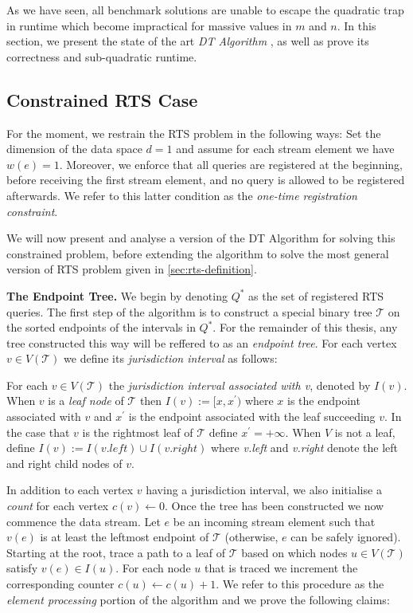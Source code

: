 As we have seen, all benchmark solutions are unable to escape the quadratic trap in runtime which become impractical for massive values in $m$ and $n$. In this section, we present the state of the art \textit{DT Algorithm} \cite{GAN16}, as well as prove its correctness and sub-quadratic runtime.

\subsection{Constrained RTS Case}
\label{ssec:constrained-DT-algorithm}

For the moment, we restrain the RTS problem in the following ways: Set the dimension of the data space $d = 1$ and assume for each stream element we have $w(e) =1$. Moreover, we enforce that all queries are registered at the beginning, before receiving the first stream element, and no query is allowed to be registered afterwards. We refer to this latter condition as the \textit{one-time registration constraint}.

We will now present and analyse a version of the DT Algorithm for solving this constrained problem, before extending the algorithm to solve the most general version of RTS problem given in \cref{sec:rts-definition}.

\textbf{The Endpoint Tree.} We begin by denoting $Q^*$ as the set of registered RTS queries. The first step of the algorithm is to construct a special binary tree $\mathcal{T}$ on the sorted endpoints of the intervals in $Q^*$. For the remainder of this thesis, any tree constructed this way will be reffered to as an \textit{endpoint tree}. For each vertex $v\in V(\mathcal{T})$ we define its \textit{jurisdiction interval} as follows: 

\begin{definition}
    For each $v\in V(\mathcal{T})$ the \textit{jurisdiction interval associated with v}, denoted by $I(v)$. When $v$ is a \textit{leaf node} of $\mathcal{T}$ then $I(v) := [x, x^\prime)$ where $x$ is the endpoint associated with $v$ and $x^\prime$ is the endpoint associated with the leaf succeeding $v$. In the case that $v$ is the rightmost leaf of $\mathcal{T}$ define $x^\prime = +\infty$. When $V$ is not a leaf, define $I(v) := I(v.left) \cup I(v.right)$ where \textit{v.left} and \textit{v.right} denote the left and right child nodes of $v$.
\end{definition} 

In addition to each vertex $v$ having a jurisdiction interval, we also initialise a \textit{count} for each vertex $c(v) \leftarrow 0$. Once the tree has been constructed we now commence the data stream. Let $e$ be an incoming stream element such that $v(e)$ is at least the leftmost endpoint of $\mathcal{T}$ (otherwise, $e$ can be safely ignored). Starting at the root, trace a path to a leaf of $\mathcal{T}$ based on which nodes $u\in V(\mathcal{T})$ satisfy $v(e) \in I(u)$. For each node $u$ that is traced we increment the corresponding counter $c(u) \leftarrow c(u) + 1$. We refer to this procedure as the \textit{element processing} portion of the algorithm and we prove the following claims: 

